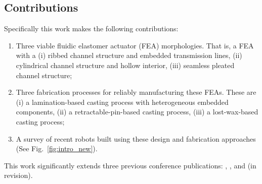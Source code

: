 \subsection{Contributions}
Specifically this work makes the following contributions:
\begin{enumerate}
  \item Three viable fluidic elastomer actuator (FEA) morphologies. That is, a FEA with a (i) ribbed channel structure and embedded transmission lines, (ii) cylindrical channel structure and hollow interior, (iii) seamless pleated channel structure;
  \item Three fabrication processes for reliably manufacturing these FEAs. These are (i) a lamination-based casting process with heterogeneous embedded components, (ii) a retractable-pin-based casting process, (iii) a lost-wax-based casting process;
  \item A survey of recent robots built using these design and fabrication approaches (See Fig.~\ref{fig:intro_new}).
\end{enumerate}
This work significantly extends three previous conference publications: \citep{marchese2014design}, \citep{marchese2014whole}, and \citep{katzschmann2015autonomous} (in revision). %
